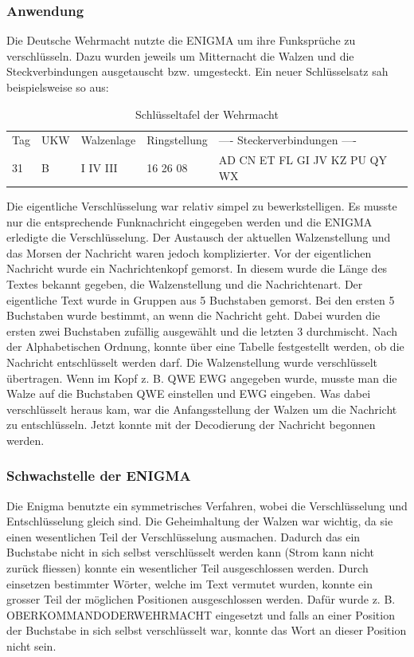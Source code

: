 \subsubsection{Anwendung}
Die Deutsche Wehrmacht nutzte die ENIGMA um ihre Funksprüche zu verschlüsseln. Dazu wurden jeweils um Mitternacht die Walzen und die Steckverbindungen ausgetauscht bzw. umgesteckt. Ein neuer Schlüsselsatz sah beispielsweise so aus:
%
\begin{table}[ht]
\caption{Schlüsseltafel der Wehrmacht}
\begin{center}
\begin{tabular}{|l|l|l|l|l}
Tag & UKW & Walzenlage & Ringstellung &  ---- Steckerverbindungen ---- \\
 31  &   B   &  I   IV III   &    16 26 08   &  AD CN ET FL GI JV KZ PU QY WX \\
\end{tabular}
\end{center}
\end{table}
%
Die eigentliche Verschlüsselung war relativ simpel zu bewerkstelligen. Es musste nur die entsprechende Funknachricht eingegeben werden und die ENIGMA erledigte die Verschlüsselung. Der Austausch der aktuellen Walzenstellung und das Morsen der Nachricht waren jedoch komplizierter.
%
Vor der eigentlichen Nachricht wurde ein Nachrichtenkopf gemorst. In diesem wurde die Länge des Textes bekannt gegeben, die Walzenstellung und die Nachrichtenart. 
Der eigentliche Text wurde in Gruppen aus 5 Buchstaben gemorst. Bei den ersten 5 Buchstaben wurde bestimmt, an wenn die Nachricht geht. Dabei wurden die ersten zwei Buchstaben zufällig ausgewählt und die letzten 3 durchmischt. Nach der Alphabetischen Ordnung, konnte über eine Tabelle festgestellt werden, ob die Nachricht entschlüsselt werden darf.
Die Walzenstellung wurde verschlüsselt übertragen. Wenn im Kopf z. B. QWE EWG angegeben wurde, musste man die Walze auf die Buchstaben QWE einstellen und EWG eingeben. Was dabei verschlüsselt heraus kam, war die Anfangsstellung der Walzen um die Nachricht zu entschlüsseln. Jetzt konnte mit der Decodierung der Nachricht begonnen werden.
%
\subsubsection{Schwachstelle der ENIGMA}
Die Enigma benutzte ein symmetrisches Verfahren, wobei die Verschlüsselung und Entschlüsselung gleich sind. %
Die Geheimhaltung der Walzen war wichtig, da sie einen wesentlichen Teil der Verschlüsselung ausmachen.
Dadurch das ein Buchstabe nicht in sich selbst verschlüsselt werden kann (Strom kann nicht zurück fliessen) konnte ein wesentlicher Teil ausgeschlossen werden.
Durch einsetzen bestimmter Wörter, welche im Text vermutet wurden, konnte ein grosser Teil der möglichen Positionen ausgeschlossen werden. Dafür wurde z. B. OBERKOMMANDODERWEHRMACHT eingesetzt und falls an einer Position der Buchstabe in sich selbst verschlüsselt war, konnte das Wort an dieser Position nicht sein.
%
